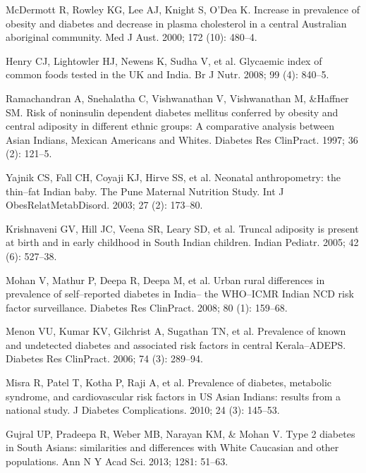 \begin{thebibliography}{99}
 McDermott R, Rowley KG, Lee AJ, Knight S, O’Dea K. Increase in prevalence of obesity and diabetes and decrease in plasma cholesterol in a central Australian aboriginal community. Med J Aust. 2000; 172 (10): 480–4.

  Henry CJ, Lightowler HJ, Newens K, Sudha V, et al. Glycaemic index of common foods tested in the UK and India. Br J Nutr. 2008; 99 (4): 840–5.

  Ramachandran A, Snehalatha C, Vishwanathan V, Vishwanathan M, \&Haffner SM. Risk of noninsulin dependent diabetes mellitus conferred by obesity and central adiposity in different ethnic groups: A comparative analysis between Asian Indians, Mexican Americans and Whites. Diabetes Res ClinPract. 1997; 36 (2): 121–5.

  Yajnik CS, Fall CH, Coyaji KJ, Hirve SS, et al. Neonatal anthropometry: the thin–fat Indian baby. The Pune Maternal Nutrition Study. Int J ObesRelatMetabDisord. 2003; 27 (2): 173–80.

  Krishnaveni GV, Hill JC, Veena SR, Leary SD, et al. Truncal adiposity is present at birth and in early childhood in South Indian children. Indian Pediatr. 2005; 42 (6): 527–38.

  Mohan V, Mathur P, Deepa R, Deepa M, et al. Urban rural differences in prevalence of self–reported diabetes in India– the WHO–ICMR Indian NCD risk factor surveillance. Diabetes Res ClinPract. 2008; 80 (1): 159–68.

  Menon VU, Kumar KV, Gilchrist A, Sugathan TN, et al. Prevalence of known and undetected diabetes and associated risk factors in central Kerala–ADEPS. Diabetes Res ClinPract. 2006; 74 (3): 289–94.

  Misra R, Patel T, Kotha P, Raji A, et al. Prevalence of diabetes, metabolic syndrome, and cardiovascular risk factors in US Asian Indians: results from a national study. J Diabetes Complications. 2010; 24 (3): 145–53.

  Gujral UP, Pradeepa R, Weber MB, Narayan KM, \& Mohan V. Type 2 diabetes in South Asians: similarities and differences with White Caucasian and other populations. Ann N Y Acad Sci. 2013; 1281: 51–63.

 \end{thebibliography}


